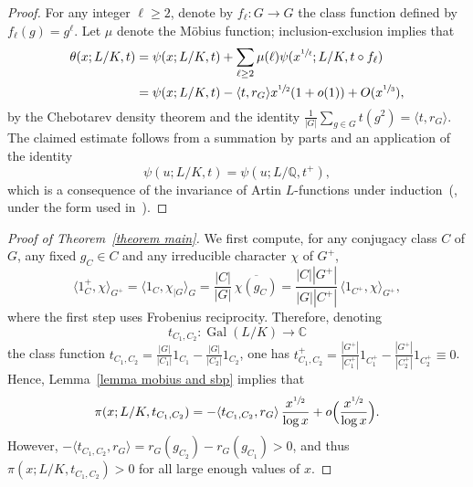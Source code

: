 \documentclass[10pt]{amsart}
\theoremstyle{definition}
\DeclareMathOperator{\Gal}{Gal}
\newcommand{\Q}{\mathbb Q}
\begin{document}
\begin{proof}
For any integer $\ell\geq 2$, denote by $f_\ell\colon G\to G$ the class function defined by $f_\ell(g)=g^\ell$. Let $\mu$ denote the Möbius function; inclusion-exclusion implies that
\begin{align*}
\theta(x;L/K,t) &=\psi(x;L/K,t) + \sum_{\ell \geq 2} \mu(\ell) \psi(x^{\sfrac 1\ell};L/K,t\circ f_\ell) \\
&= \psi(x;L/K,t)- \langle t,r_G \rangle x^{\sfrac 12}(1+o(1))+O(x^{\sfrac 13}),
\end{align*}
by the Chebotarev density theorem and the identity $ \frac 1{|G|}\sum_{g\in G} t(g^2) = \langle t,r_G\rangle . $
The claimed estimate follows from a summation by parts and an application of the identity \[\psi(u;L/K,t)=\psi(u;L/\Q,t^+),\] which is a consequence of the invariance of Artin $L$-functions under induction~(\cite[\S2]{Artin}, under the form used in~\cite[Prop.\,3.11]{FJ}).
\end{proof}

\begin{proof}[Proof of Theorem~\ref{theorem main}]
We first compute, for any conjugacy class $C$ of $G$, any fixed $g_C\in C$ and any irreducible character $\chi$ of $G^+$,
\[
\langle 1_{C}^+,\chi\rangle_{G^+}=
\langle 1_C,\chi_{|G}\rangle_G=\frac{|C|}{|G|}\,\overline{\chi(g_C)}=\frac{|C| |G^+|}{|G| |C^+|}\,\langle 1_{C^+},\chi\rangle_{G^+},
\]
where the first step uses Frobenius reciprocity. Therefore, denoting
\[
t_{C_1,C_2}\colon\Gal(L/K)\to \mathbb C
\]
the class function $t_{C_1,C_2}=\frac{|G|}{|C_1|}1_{C_1}-\frac{|G|}{|C_2|}1_{C_2}$, one has $t_{C_1,C_2}^+ =\frac{|G^+|}{|C_1^+|}1_{C_1^+}-\frac{|G^+|}{|C_2^+|}1_{C_2^+} \equiv 0$. Hence, Lemma~\ref{lemma mobius and sbp} implies that
\[ \pi(x;L/K,t_{C_1,C_2}) =-\langle t_{C_1,C_2},r_G \rangle\, \frac{x^{\sfrac 12}}{\log x} + o\Big(\frac{x^{\sfrac 12}}{\log x}\Big). \]
However, $-\langle t_{C_1,C_2},r_G \rangle = r_G(g_{C_2})-r_G(g_{C_1})>0 $, and thus $ \pi(x;L/K,t_{C_1,C_2}) >0 $ for all large enough values of $x$.
\end{proof}
\end{document}
